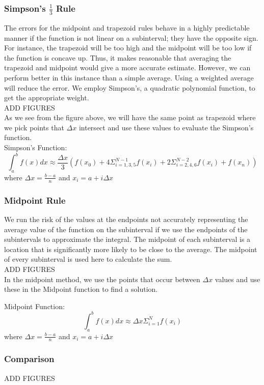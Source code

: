 \documentclass[11pt]{article}
\begin{document}
\subsubsection*{Simpson's $\frac{1}{3}$ Rule}
The errors for the midpoint and trapezoid rules behave in a highly predictable manner if the function is not linear on a subinterval; they have the opposite sign. For instance, the trapezoid will be too high and the midpoint will be too low if the function is concave up. Thus, it makes reasonable that averaging the trapezoid and midpoint would give a more accurate estimate. However, we can perform better in this instance than a simple average. Using a weighted average will reduce the error. We employ Simpson's, a quadratic polynomial function, to get the appropriate weight.\\

ADD FIGURES\\

As we see from the figure above, we will have the same point as trapezoid where we pick points that $\Delta x$ intersect and use these values to evaluate the Simpson’s function.\\

Simpson's Function:
\[
	\int_a^b f(x)dx \approx \frac{\Delta x}{3} \left(f(x_0) + 4\Sigma_{i=1,3,5}^{N-1}f(x_i)+2\Sigma_{i=2,4,6}^{N-2}f(x_i)+f(x_n)\right)
\]
where $\Delta x = \frac{b - a}{n}$ and $x_i = a + i\Delta x$

\subsubsection*{Midpoint Rule}
We run the risk of the values at the endpoints not accurately representing the average value of the function on the subinterval if we use the endpoints of the subintervals to approximate the integral. The midpoint of each subinterval is a location that is significantly more likely to be close to the average.  The midpoint of every subinterval is used here to calculate the sum.\\

ADD FIGURES\\

In the midpoint method, we use the points that occur between $\Delta x$ values and use these in the Midpoint function to find a solution.

Midpoint Function:
\[
	\int_a^b f(x)dx \approx \Delta x \Sigma_{i=1}^Nf(x_i)
\]
where $\Delta x = \frac{b - a}{n}$ and $x_i = a + i\Delta x$

\subsubsection*{Comparison}
ADD FIGURES \\
\end{document}
